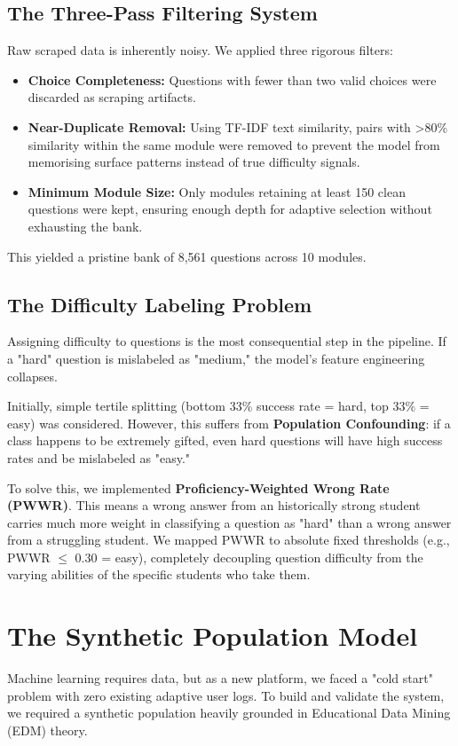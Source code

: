 \documentclass[11pt,a4paper]{article}
\begin{document}
\subsection{The Three-Pass Filtering System}
Raw scraped data is inherently noisy. We applied three rigorous filters:
\begin{itemize}[label=\textcolor{primaryblue}{\textbullet}]
    \item \textbf{Choice Completeness:} Questions with fewer than two valid choices were discarded as scraping artifacts.
    \item \textbf{Near-Duplicate Removal:} Using TF-IDF text similarity, pairs with >80\% similarity within the same module were removed to prevent the model from memorising surface patterns instead of true difficulty signals.
    \item \textbf{Minimum Module Size:} Only modules retaining at least 150 clean questions were kept, ensuring enough depth for adaptive selection without exhausting the bank.
\end{itemize}
This yielded a pristine bank of 8,561 questions across 10 modules.

\subsection{The Difficulty Labeling Problem}
Assigning difficulty to questions is the most consequential step in the pipeline. If a "hard" question is mislabeled as "medium," the model's feature engineering collapses.

Initially, simple tertile splitting (bottom 33\% success rate = hard, top 33\% = easy) was considered. However, this suffers from \textbf{Population Confounding}: if a class happens to be extremely gifted, even hard questions will have high success rates and be mislabeled as "easy." 

To solve this, we implemented \textbf{Proficiency-Weighted Wrong Rate (PWWR)}. This means a wrong answer from an historically strong student carries much more weight in classifying a question as "hard" than a wrong answer from a struggling student. We mapped PWWR to absolute fixed thresholds (e.g., PWWR $\leq$ 0.30 = easy), completely decoupling question difficulty from the varying abilities of the specific students who take them.

\section{The Synthetic Population Model}
Machine learning requires data, but as a new platform, we faced a "cold start" problem with zero existing adaptive user logs. To build and validate the system, we required a synthetic population heavily grounded in Educational Data Mining (EDM) theory.
\end{document}
